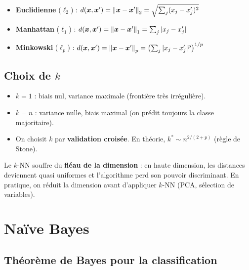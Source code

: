 \begin{formules}[title=\textbf{M\'etriques courantes}]
\begin{itemize}
  \item \textbf{Euclidienne} ($\ell_2$) : $d(\bm{x}, \bm{x}') = \left\| \bm{x} - \bm{x}' \right\|_2
        = \sqrt{\sum_{j}(x_j - x'_j)^2}$
  \item \textbf{Manhattan} ($\ell_1$) : $d(\bm{x}, \bm{x}') = \left\| \bm{x} - \bm{x}' \right\|_1
        = \sum_{j}|x_j - x'_j|$
  \item \textbf{Minkowski} ($\ell_p$) : $d(\bm{x}, \bm{x}') = \left\| \bm{x} - \bm{x}' \right\|_p
        = \bigl(\sum_{j}|x_j - x'_j|^p\bigr)^{1/p}$
\end{itemize}
\end{formules}

\subsection{Choix de $k$}

\begin{intuition}[title=\textbf{Compromis biais-variance dans $k$-NN}]
\begin{itemize}
  \item $k = 1$ : biais nul, variance maximale (fronti\`ere tr\`es irr\'eguli\`ere).
  \item $k = n$ : variance nulle, biais maximal (on pr\'edit toujours la classe majoritaire).
  \item On choisit $k$ par \textbf{validation crois\'ee}. En th\'eorie, $k^* \sim n^{2/(2+p)}$
        (r\`egle de Stone).
\end{itemize}
\end{intuition}

\begin{remarque}
Le $k$-NN souffre du \textbf{fl\'eau de la dimension} : en haute dimension, les distances
deviennent quasi uniformes et l'algorithme perd son pouvoir discriminant. En pratique,
on r\'eduit la dimension avant d'appliquer $k$-NN (PCA, s\'election de variables).
\end{remarque}

\section{Na\"ive Bayes}
\label{sec:naive-bayes}

\subsection{Th\'eor\`eme de Bayes pour la classification}

